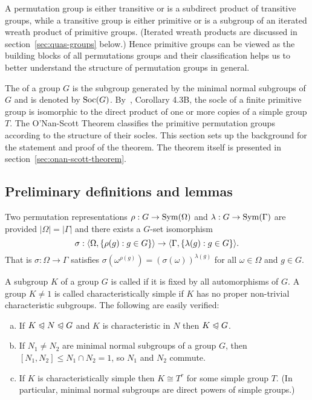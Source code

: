 A permutation group is either transitive
or is a subdirect product of transitive groups, while a transitive group is
either primitive or is a subgroup of an iterated wreath product of primitive
groups. (Iterated wreath products are discussed in section~\ref{sec:quas-groups} below.)
Hence primitive groups can be viewed as the building blocks of all
permutations groups and their classification helps us to better understand
the structure of permutation groups in general.

The  of a group $G$ is the subgroup generated by the minimal normal
subgroups of $G$ and is denoted by $\mathrm{Soc}(G)$. By~\cite{Dixon:1996}, Corollary 4.3B, the socle
of a finite primitive group is isomorphic to the direct product of one or more
copies of a simple group $T$.  The O'Nan-Scott Theorem classifies the primitive
permutation groups according to the structure of their socles.  This section
sets up the background for the statement and proof of the theorem. The
theorem itself is presented in section~\ref{sec:onan-scott-theorem}.

\subsection{Preliminary definitions and lemmas}
Two permutation representations 
$\rho : G \rightarrow \operatorname{Sym}(\Omega)$ and
$\lambda : G \rightarrow \operatorname{Sym}(\Gamma)$ are  provided $|\Omega| =
|\Gamma|$ and there exists a $G$-set isomorphism
\[
\sigma : \langle\Omega, \{\rho(g) : g\in G\}\rangle \rightarrow 
\langle\Gamma, \{\lambda(g) : g\in G\}\rangle.
\]
That is  $\sigma: \Omega \rightarrow 
\Gamma$ satisfies $\sigma(\omega^{\rho(g)}) = (\sigma(\omega))^{\lambda(g)}$ for
all $\omega \in \Omega$ and $g \in G$.

A subgroup $K$ of a group $G$ is called  if it is fixed by all
automorphisms of $G$.
A group $K \neq 1$ is called characteristically simple if $K$ has no proper 
non-trivial characteristic subgroups.  The following are easily verified:
\begin{enumerate}[(a)]
\item If $K \trianglelefteqslant N \trianglelefteqslant G$ and $K$ is characteristic in $N$ then
  $K\trianglelefteqslant G$.
\item If $N_1 \neq N_2$ are minimal normal subgroups of a group $G$, then $[N_1,
  N_2]\leq N_1\cap N_2 = 1$, so $N_1$ and $N_2$ commute.
\item If $K$ is characteristically simple then $K\cong T^r$ for some
 simple group $T$. (In particular, minimal normal subgroups are direct powers of
 simple groups.)

\end{enumerate}

